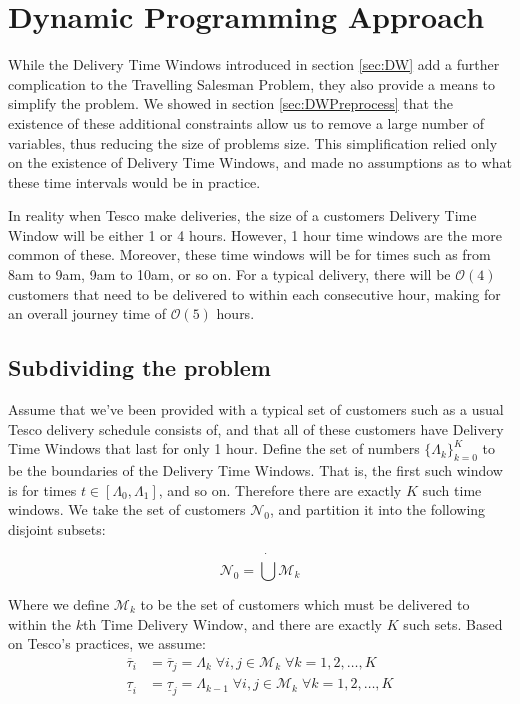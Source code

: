 \section{Dynamic Programming Approach}
\label{sec:deterministic_dynamic}
\label{sef:lin_time_dep}
While the Delivery Time Windows introduced in section \ref{sec:DW} add a further complication to the Travelling Salesman Problem, they also provide a means to simplify the problem. We showed in section \ref{sec:DWPreprocess} that the existence of these additional constraints allow us to remove a large number of variables, thus reducing the size of problems size. This simplification relied only on the existence of Delivery Time Windows, and made no assumptions as to what these time intervals would be in practice.

In reality when Tesco make deliveries, the size of a customers Delivery Time Window will be either 1 or 4 hours. However, 1 hour time windows are the more common of these. Moreover, these time windows will be for times such as from 8am to 9am, 9am to 10am, or so on. For a typical delivery, there will be $\mathcal{O}(4)$ customers that need to be delivered to within each consecutive hour, making for an overall journey time of $\mathcal{O}(5)$ hours.

\subsection{Subdividing the problem}
\label{sec:subdivide}
Assume that we've been provided with a typical set of customers such as a usual Tesco delivery schedule consists of, and that all of these customers have Delivery Time Windows that last for only 1 hour. Define the set of numbers $\{\Lambda_k\}_{k = 0}^K$ to be the boundaries of the Delivery Time Windows. That is, the first such window is for times $t \in [\Lambda_0, \Lambda_1]$, and so on. Therefore there are exactly $K$ such time windows. We take the set of customers $\mathcal{N}_0$, and partition it into the following disjoint subsets:

\begin{equation*}
\mathcal{N}_0 = \dot{\bigcup}\mathcal{M}_k
\end{equation*}

Where we define $\mathcal{M}_k$ to be the set of customers which must be delivered to within the $k$th Time Delivery Window, and there are exactly $K$ such sets. Based on Tesco's practices, we assume:
\begin{align*}
\overline{\tau}_i &= \overline{\tau}_j = \Lambda_{k} \; \forall i,j \in \mathcal{M}_k\; \forall k = 1,2,\ldots, K\\
\underline{\tau}_i &= \underline{\tau}_j = \Lambda_{k-1} \; \forall i,j \in \mathcal{M}_k\; \forall k = 1,2,\ldots, K
\end{align*}


